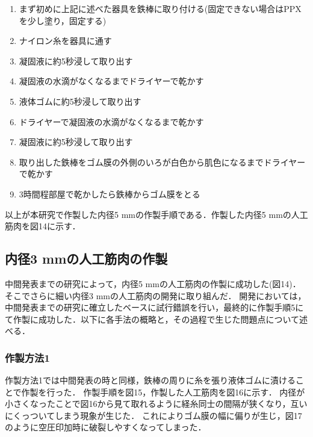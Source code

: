 \begin{enumerate}
  \item まず初めに上記に述べた器具を鉄棒に取り付ける(固定できない場合はPPXを少し塗り，固定する)
  \item ナイロン糸を器具に通す
  \item 凝固液に約5秒浸して取り出す
  \item 凝固液の水滴がなくなるまでドライヤーで乾かす
  \item 液体ゴムに約5秒浸して取り出す
  \item ドライヤーで凝固液の水滴がなくなるまで乾かす
  \item 凝固液に約5秒浸して取り出す
  \item 取り出した鉄棒をゴム膜の外側のいろが白色から肌色になるまでドライヤーで乾かす
  \item 3時間程部屋で乾かしたら鉄棒からゴム膜をとる
\end{enumerate}
以上が本研究で作製した内径5 mmの作製手順である．作製した内径5 mmの人工筋肉を図14に示す．

\subsection{内径3 mmの人工筋肉の作製}
中間発表までの研究によって，内径5 mmの人工筋肉の作製に成功した(図14)．そこでさらに細い内径3 mmの人工筋肉の開発に取り組んだ．
開発においては，中間発表までの研究に確立したベースに試行錯誤を行い，最終的に作製手順5にて作製に成功した．以下に各手法の概略と，その過程で生じた問題点について述べる．
\subsubsection{作製方法1}
作製方法1では中間発表の時と同様，鉄棒の周りに糸を張り液体ゴムに漬けることで作製を行った．
作製手順を図15，作製した人工筋肉を図16に示す．
内径が小さくなったことで図16から見て取れるように経糸同士の間隔が狭くなり，互いにくっついてしまう現象が生じた．
これによりゴム膜の幅に偏りが生じ，図17のように空圧印加時に破裂しやすくなってしまった．
